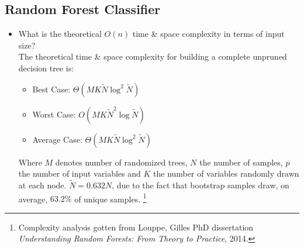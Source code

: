 \documentclass[12pt]{article}
\begin{document}
\subsection*{Random Forest Classifier}
\begin{itemize} 
\item What is the theoretical $O(n)$ time \& space complexity in terms of input size?\\
The theoretical time \& space complexity for building a complete unpruned decision tree is:
\begin{itemize}[noitemsep,nolistsep]
\item Best Case: $\Theta(MK\widetilde{N}\log^2 \widetilde{N})$ 
\item Worst Case: $O(MK\widetilde{N}^2\log \widetilde{N})$ 
\item Average Case: $\Theta(MK\widetilde{N}\log^2 \widetilde{N})$
\end{itemize}
Where $M$ denotes number of randomized trees, $N$ the number of samples, $p$ the number of input variables and $K$ the number of variables randomly drawn at each node. $\widetilde{N} = 0.632 N$, due to the fact that bootstrap samples draw, on average, $63.2\%$ of unique samples. 
\footnote{Complexity analysis gotten from Louppe, Gilles PhD dissertation \textit{Understanding Random Forests: From Theory to Practice}, 2014.}


\end{itemize}
\end{document}
